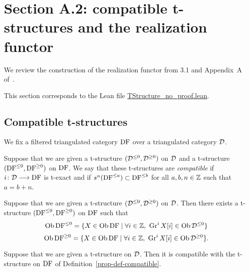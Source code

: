 \chapter{Section A.2: compatible t-structures and the realization functor}

We review the construction of the realization functor from \cite{BBD} 3.1 and Appendix~A of~\cite{Be1}.

This section corresponds to the Lean file \url{TStructure_no_proof.lean}.

\section{Compatible t-structures}

We fix a filtered triangulated category $\operatorname{DF}$ over a triangulated category $\mathcal{D}$.

\begin{definition}
\label{def-compatible}
\leanok
{}
Suppose that we are given
a t-structure $(\mathcal{D}^{\leq 0},\mathcal{D}^{\geq 0})$ on $\mathcal{D}$ and a t-structure $(\operatorname{DF}^{\leq 0},\operatorname{DF}^{\geq 0})$ on $\operatorname{DF}$.
We say that these t-structures are \emph{compatible} if $i\colon \mathcal{D}\longrightarrow\operatorname{DF}$ is t-exact and if $s^n(\operatorname{DF}^{\leq a})\subset\operatorname{DF}^{\leq b}$
for all $a,b,n\in\mathbb{Z}$ such that $a = b + n$.

\end{definition}

\begin{definition}
\label{prop-def-compatible}
\leanok
{}
Suppose that we are given
a t-structure $(\mathcal{D}^{\leq 0},\mathcal{D}^{\geq 0})$ on $\mathcal{D}$.
Then there exists a t-structure $(\operatorname{DF}^{\leq 0},\operatorname{DF}^{\geq 0})$ on $\operatorname{DF}$ such that 
\[\Ob\DF^{\leq 0}=\{X\in\Ob\DF\mid \forall i\in\Z,\ \Gra^i X[i]\in\Ob\Df^{\leq 0}\}\]
\[\Ob\DF^{\geq 0}=\{X\in\Ob\DF\mid \forall i\in\Z,\ \Gra^i X[i]\in\Ob\Df^{\geq 0}\}.\]

\end{definition}

\begin{proposition}
\label{prop-compatible}
\leanok
{}
Suppose that we are given
a t-structure on $\mathcal{D}$. Then it is compatible with the t-structure on $\operatorname{DF}$ 
of Definition~\ref{prop-def-compatible}.

\end{proposition}

